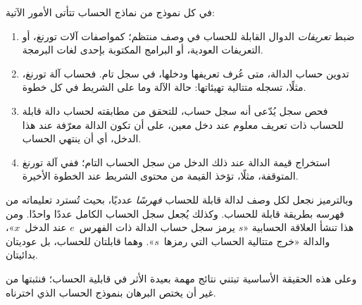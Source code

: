 \documentclass[../../../include/open-logic-section]{subfiles}
\begin{document}

في كل نموذج من نماذج الحساب تتأتى الأمور الآتية:
\begin{enumerate}
\item ضبط \emph{تعريفات} الدوال القابلة للحساب في وصف منتظم؛
  كمواصفات آلات تورنغ، أو التعريفات العودية، أو البرامج المكتوبة
  بإحدى لغات البرمجة.
\item تدوين حساب الدالة، متى عُرف تعريفها ودخلها، في سجل تام. فحساب
  آلة تورنغ، مثلًا، تسجله متتالية تهيئاتها: حالة الآلة وما على
  الشريط في كل خطوة.
\item فحص سجل يُدّعى أنه سجل حساب، للتحقق من مطابقته لحساب
  دالة قابلة للحساب ذات تعريف معلوم عند دخل معين، على أن تكون الدالة معرّفة
  عند هذا الدخل، أي أن ينتهي الحساب.
\item استخراج قيمة الدالة عند ذلك الدخل من سجل
  الحساب التام؛ ففي آلة تورنغ المتوقفة، مثلًا، تؤخذ القيمة من محتوى الشريط
  عند الخطوة الأخيرة.
\end{enumerate}

وبالترميز نجعل لكل وصف لدالة قابلة للحساب \emph{فهرسًا} عدديًا،
بحيث تُسترد تعليماته من فهرسه بطريقة قابلة
للحساب. وكذلك يُجعل سجل الحساب الكامل عددًا واحدًا. ومن هذا
تنشأ العلاقة الحسابية «$s$ يرمز سجل حساب الدالة ذات الفهرس~$e$
عند الدخل~$x$»، والدالة «خرج متتالية الحساب التي رمزها~$s$». وهما قابلتان
للحساب، بل عوديتان بدائيتان.

وعلى هذه الحقيقة الأساسية تبتني نتائج مهمة بعيدة الأثر
في قابلية الحساب؛ فنثبتها من غير أن يختص البرهان بنموذج الحساب
الذي اخترناه.
\end{document}
